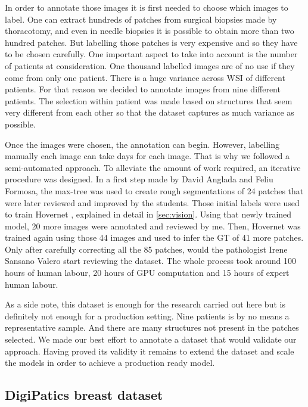 In order to annotate those images it is first needed to choose which images to label. One can extract hundreds of patches from surgical biopsies made by thoracotomy, and even in needle biopsies it is possible to obtain more than two hundred patches. But labelling those patches is very expensive and so they have to be chosen carefully. One important aspect to take into account is the number of patients at consideration. One thousand labelled images are of no use if they come from only one patient. There is a huge variance across WSI of different patients. For that reason we decided to annotate images from nine different patients. The selection within patient was made based on structures that seem very different from each other so that the dataset captures as much variance as possible.

Once the images were chosen, the annotation can begin. However, labelling manually each image can take days for each image. That is why we followed a semi-automated approach. To alleviate the amount of work required, an iterative procedure was designed. In a first step made by David Anglada and Feliu Formosa, the max-tree \cite{maxtree} was used to create rough segmentations of 24 patches that were later reviewed and improved by the students. Those initial labels were used to train Hovernet \cite{hovernet}, explained in detail in \autoref{sec:vision}. Using that newly trained model, 20 more images were annotated and reviewed by me. Then, Hovernet was trained again using those 44 images and used to infer the GT of 41 more patches. Only after carefully correcting all the 85 patches, would the pathologist Irene Sansano Valero start reviewing the dataset. The whole process took around 100 hours of human labour, 20 hours of GPU computation and 15 hours of expert human labour.

As a side note, this dataset is enough for the research carried out here but is definitely not enough for a production setting. Nine patients is by no means a representative sample. And there are many structures not present in the patches selected. We made our best effort to annotate a dataset that would validate our approach. Having proved its validity it remains to extend the dataset and scale the models in order to achieve a production ready model.

\subsection{DigiPatics breast dataset}\label{sec:data_breast}


